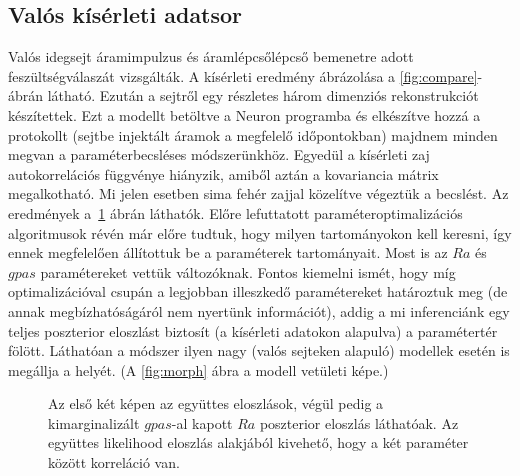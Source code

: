 \subsection{Valós kísérleti adatsor}
Valós idegsejt áramimpulzus és áramlépcsőlépcső bemenetre adott feszültségválaszát vizsgálták. A kísérleti eredmény ábrázolása a \ref{fig:compare}-ábrán látható. Ezután a sejtről egy részletes három dimenziós rekonstrukciót készítettek. Ezt a modellt betöltve a Neuron programba és elkészítve hozzá a protokollt (sejtbe injektált áramok a megfelelő időpontokban) majdnem minden megvan a paraméterbecsléses módszerünkhöz. Egyedül a kísérleti zaj autokorrelációs függvénye hiányzik, amiből aztán a kovariancia mátrix megalkotható. Mi jelen esetben sima fehér zajjal közelítve végeztük a becslést. Az eredmények a~\ref{fig:exp} ábrán láthatók.
Előre lefuttatott paraméteroptimalizációs algoritmusok révén már előre tudtuk, hogy milyen tartományokon kell keresni, így ennek megfelelően állítottuk be a paraméterek tartományait. Most is az $Ra$ és $gpas$ paramétereket vettük változóknak. Fontos kiemelni ismét, hogy míg optimalizációval csupán a legjobban illeszkedő paramétereket határoztuk meg (de annak megbízhatóságáról nem nyertünk információt), addig a mi inferenciánk egy teljes poszterior eloszlást biztosít (a kísérleti adatokon alapulva) a paramétertér fölött. Láthatóan a módszer ilyen nagy (valós sejteken alapuló) modellek esetén is megállja a helyét. (A \ref{fig:morph} ábra a modell vetületi képe.)

\begin{figure}
	\hfill
	\hfill
	\hfill
	\vfill
	\caption[Kísérleti adatok fehér zajjal közelítve]{Az első két képen az együttes eloszlások, végül pedig a kimarginalizált $gpas$-al kapott $Ra$ poszterior eloszlás láthatóak. Az együttes likelihood eloszlás alakjából kivehető, hogy a két paraméter között korreláció van.}%
	\label{fig:exp}
\end{figure}


